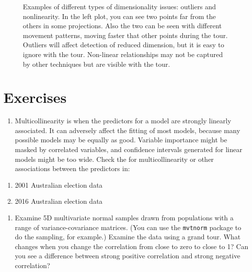 \documentclass[
  letterpaper,
]{book}
\providecommand{\tightlist}{%
  \setlength{\itemsep}{0pt}\setlength{\parskip}{0pt}}\usepackage{longtable,booktabs,array}
\begin{document}
\begin{figure}

\begin{minipage}[t]{0.50\linewidth}

{\centering 

}

\end{minipage}%

\caption{\label{fig-outlier-nonlin}Examples of different types of
dimensionality issues: outliers and nonlinearity. In the left plot, you
can see two points far from the others in some projections. Also the two
can be seen with different movement patterns, moving faster that other
points during the tour. Outliers will affect detection of reduced
dimension, but it is easy to ignore with the tour. Non-linear
relationships may not be captured by other techniques but are visible
with the tour.}

\end{figure}

\hypertarget{exercises-2}{%
\section*{Exercises}\label{exercises-2}}


\begin{enumerate}
\def\labelenumi{\arabic{enumi}.}
\tightlist
\item
  Multicollinearity is when the predictors for a model are strongly
  linearly associated. It can adversely affect the fitting of most
  models, because many possible models may be equally as good. Variable
  importance might be masked by correlated variables, and confidence
  intervals generated for linear models might be too wide. Check the for
  multicollinearity or other associations between the predictors in:
\end{enumerate}

\begin{enumerate}
\def\labelenumi{\alph{enumi}.}
\tightlist
\item
  2001 Australian election data
\item
  2016 Australian election data
\end{enumerate}

\begin{enumerate}
\def\labelenumi{\arabic{enumi}.}
\setcounter{enumi}{1}
\tightlist
\item
  Examine 5D multivariate normal samples drawn from populations with a
  range of variance-covariance matrices. (You can use the
  \texttt{mvtnorm} package to do the sampling, for example.) Examine the
  data using a grand tour. What changes when you change the correlation
  from close to zero to close to 1? Can you see a difference between
  strong positive correlation and strong negative correlation?
\end{enumerate}
\end{document}
